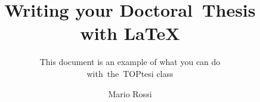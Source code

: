\documentclass[%
   corpo=12pt, %
   twoside, %
   tipotesi=scudo,
   mybibliostyle, %
   ]{toptesi}
\begin{document}
\begin{ThesisTitlePage}
\author{Mario Rossi}
\title{Writing your Doctoral~Thesis\\with \LaTeX}
\subtitle{This document is an example of what you can do\\with~the~TOPtesi class}
%

\end{ThesisTitlePage}
\end{document}
